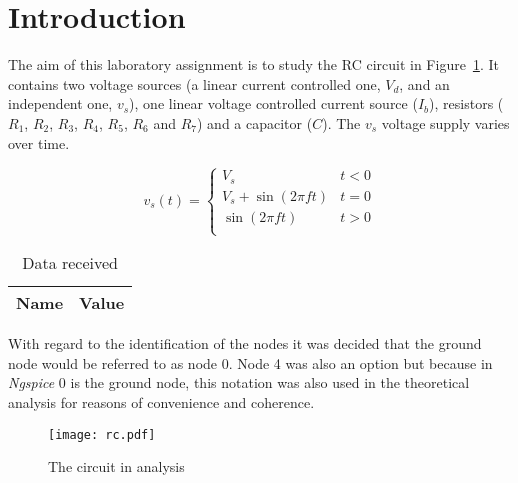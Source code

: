 \section{Introduction}
\label{sec:introduction}


The aim of this laboratory assignment is to study the RC circuit in Figure~\ref{fig:rc}. It contains two voltage sources (a linear current controlled one, $V_d$, and an independent one, $v_s$), one linear voltage controlled  current source ($I_b$), resistors ($R_1$, $R_2$, $R_3$, $R_4$, $R_5$, $R_6$ and $R_7$) and a capacitor ($C$).
The $v_s$ voltage supply varies over time.

\[ 
v_s (t)= \left\{
\begin{array}{ll}
  V_s & t < 0 \\
  V_s + \sin(2 \pi f t) & t = 0 \\
  \sin(2 \pi f t) & t > 0\\
\end{array} 
\right. 
\]

\begin{table}[hbt!]
  \centering
  \begin{tabular}{|c|c|}
    \hline    
    {\bf Name} & {\bf Value} \\ \hline
    
  \end{tabular}
  \caption{Data received}
  \label{tab:data}
\end{table}



With regard to the identification of the nodes it was decided that the ground node would be referred to as node 0. Node 4 was also an option but because in \textit{Ngspice} 0 is the ground node, this notation was also used in the theoretical analysis for reasons of convenience and coherence.



\begin{figure}[h] \centering
\texttt{[image: rc.pdf]}
\caption{The circuit in analysis}
\label{fig:rc}
\end{figure}




%    




